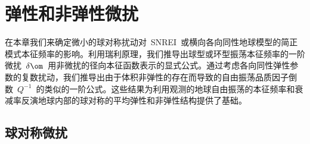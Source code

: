 \chapter{弹性和非弹性微扰}
\label{chap:spherperts}

在本章我们来确定微小的球对称扰动对~SNREI~或横向各向同性地球模型的简正模式本征频率的影响。利用瑞利原理，我们推导出球型或环型振荡本征频率的一阶微扰~$\delta\om$~用非微扰的径向本征函数表示的显式公式。通过考虑各向同性弹性参数的复数扰动，我们推导出由于体积非弹性的存在而导致的自由振荡品质因子倒数~$Q^{-1}$~的类似的一阶公式。这些结果为利用观测的地球自由振荡的本征频率和衰减率反演地球内部的球对称的平均弹性和非弹性结构提供了基础。

\section{球对称微扰}
%

